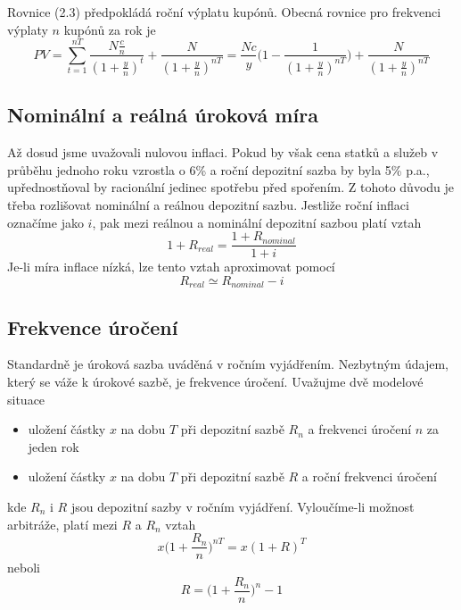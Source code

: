 \documentclass[a4paper]{book}
\begin{document}
Rovnice (2.3) předpokládá roční výplatu kupónů. Obecná rovnice pro frekvenci výplaty $n$ kupónů za rok je
\begin{equation}
PV = \sum_{t = 1}^{nT} \frac{N \frac{c}{n}}{(1 + \frac{y}{n})^t} + \frac{N}{(1 + \frac{y}{n})^{nT}} = \frac{Nc}{y} \Bigg( 1 - \frac{1}{(1 + \frac{y}{n})^{nT}}\Bigg) + \frac{N}{(1 + \frac{y}{n})^{nT}}
\end{equation}

\subsection{Nominální a reálná úroková míra}

Až dosud jsme uvažovali nulovou inflaci. Pokud by však cena statků a služeb v průběhu jednoho roku vzrostla o 6\% a roční depozitní sazba by byla 5\% p.a., upřednostňoval by racionální jedinec spotřebu před spořením. Z tohoto důvodu je třeba rozlišovat nominální a reálnou depozitní sazbu. Jestliže roční inflaci označíme jako $i$, pak mezi reálnou a nominální depozitní sazbou platí vztah
\begin{equation*}
1 + R_{real} = \frac{1 + R_{nominal}}{1 + i}
\end{equation*}
Je-li míra inflace nízká, lze tento vztah aproximovat pomocí
\begin{equation*}
R_{real} \simeq R_{nominal} - i
\end{equation*}

\subsection{Frekvence úročení}

Standardně je úroková sazba uváděná v ročním vyjádřením. Nezbytným údajem, který se váže k úrokové sazbě, je frekvence úročení. Uvažujme dvě modelové situace
\begin{itemize}
\item uložení částky $x$ na dobu $T$ při depozitní sazbě $R_n$ a frekvenci úročení $n$ za jeden rok
\item uložení částky $x$ na dobu $T$ při depozitní sazbě $R$ a roční frekvenci úročení
\end{itemize}
kde $R_n$ i $R$ jsou depozitní sazby v ročním vyjádření. Vyloučíme-li možnost arbitráže, platí mezi $R$ a $R_n$ vztah
\begin{equation*}
x \Bigg( 1 + \frac{R_n}{n} \Bigg)^{nT} = x(1 + R)^T
\end{equation*}
neboli
\begin{equation*}
R = \Bigg(1 + \frac{R_n}{n} \Bigg)^n - 1
\end{equation*}
\end{document}
